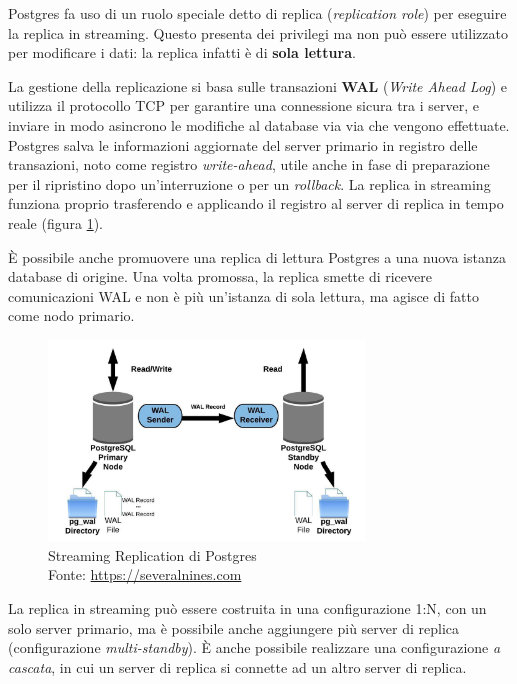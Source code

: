 Postgres fa uso di un ruolo speciale detto di replica (\textit{replication role}) per eseguire la replica in streaming. Questo presenta dei privilegi ma non può essere utilizzato per modificare i dati: la replica infatti è di \textbf{sola lettura}.

La gestione della replicazione si basa sulle transazioni \textbf{WAL} (\textit{Write Ahead Log}) e utilizza il protocollo TCP per garantire una connessione sicura tra i server, e inviare in modo asincrono le modifiche al database via via che vengono effettuate. Postgres salva le informazioni aggiornate del server primario in registro delle transazioni, noto come registro \textit{write-ahead}, utile anche in fase di preparazione per il ripristino dopo un'interruzione o per un \textit{rollback}. La replica in streaming funziona proprio trasferendo e applicando il registro al server di replica in tempo reale (figura \ref{fig:streaming-replication}).

È possibile anche promuovere una replica di lettura Postgres a una nuova istanza database di origine. Una volta promossa, la replica smette di ricevere comunicazioni WAL e non è più un'istanza di sola lettura, ma agisce di fatto come nodo primario.

\begin{figure}[H]
\centering
\captionsetup{justification=centering}
\includegraphics[width=0.75\textwidth,height=\textheight,keepaspectratio]{img/streaming_replication.jpg}
\caption{Streaming Replication di Postgres\\Fonte: \url{https://severalnines.com}}
\label{fig:streaming-replication}
\end{figure}

La replica in streaming può essere costruita in una configurazione 1:N, con un solo server primario, ma è possibile anche aggiungere più server di replica (configurazione \textit{multi-standby}). È anche possibile realizzare una configurazione \textit{a cascata}, in cui un server di replica si connette ad un altro server di replica.

